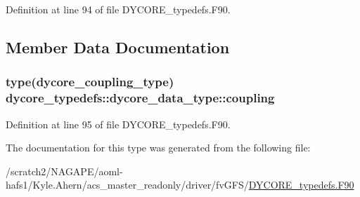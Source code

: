 Definition at line 94 of file D\-Y\-C\-O\-R\-E\-\_\-typedefs.\-F90.



\subsection{Member Data Documentation}
\subsubsection[{coupling}]{\setlength{\rightskip}{0pt plus 5cm}type({\bf dycore\-\_\-coupling\-\_\-type}) dycore\-\_\-typedefs\-::dycore\-\_\-data\-\_\-type\-::coupling}\label{structdycore__typedefs_1_1dycore__data__type_a6fb0d100c78f2d8decac67ed984d968a}


Definition at line 95 of file D\-Y\-C\-O\-R\-E\-\_\-typedefs.\-F90.



The documentation for this type was generated from the following file\-:\begin{DoxyCompactItemize}
\item 
/scratch2/\-N\-A\-G\-A\-P\-E/aoml-\/hafs1/\-Kyle.\-Ahern/acs\-\_\-master\-\_\-readonly/driver/fv\-G\-F\-S/\hyperlink{DYCORE__typedefs_8F90}{D\-Y\-C\-O\-R\-E\-\_\-typedefs.\-F90}\end{DoxyCompactItemize}

